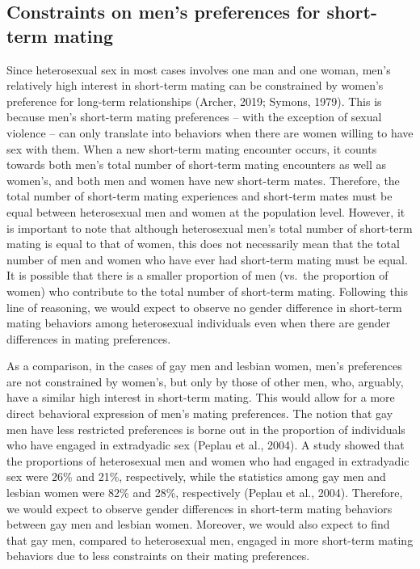 \documentclass[
  11pt,
]{article}
\begin{document}
\hypertarget{constraints-on-mens-preferences-for-short-term-mating}{%
\subsection{Constraints on men's preferences for short-term
mating}\label{constraints-on-mens-preferences-for-short-term-mating}}

Since heterosexual sex in most cases involves one man and one woman,
men's relatively high interest in short-term mating can be constrained
by women's preference for long-term relationships (Archer, 2019; Symons,
1979). This is because men's short-term mating preferences -- with the
exception of sexual violence -- can only translate into behaviors when
there are women willing to have sex with them. When a new short-term
mating encounter occurs, it counts towards both men's total number of
short-term mating encounters as well as women's, and both men and women
have new short-term mates. Therefore, the total number of short-term
mating experiences and short-term mates must be equal between
heterosexual men and women at the population level. However, it is
important to note that although heterosexual men's total number of
short-term mating is equal to that of women, this does not necessarily
mean that the total number of men and women who have ever had short-term
mating must be equal. It is possible that there is a smaller proportion
of men (vs.~the proportion of women) who contribute to the total number
of short-term mating. Following this line of reasoning, we would expect
to observe no gender difference in short-term mating behaviors among
heterosexual individuals even when there are gender differences in
mating preferences.

As a comparison, in the cases of gay men and lesbian women, men's
preferences are not constrained by women's, but only by those of other
men, who, arguably, have a similar high interest in short-term mating.
This would allow for a more direct behavioral expression of men's mating
preferences. The notion that gay men have less restricted preferences is
borne out in the proportion of individuals who have engaged in
extradyadic sex (Peplau et al., 2004). A study showed that the
proportions of heterosexual men and women who had engaged in extradyadic
sex were 26\% and 21\%, respectively, while the statistics among gay men
and lesbian women were 82\% and 28\%, respectively (Peplau et al.,
2004). Therefore, we would expect to observe gender differences in
short-term mating behaviors between gay men and lesbian women. Moreover,
we would also expect to find that gay men, compared to heterosexual men,
engaged in more short-term mating behaviors due to less constraints on
their mating preferences.
\end{document}
